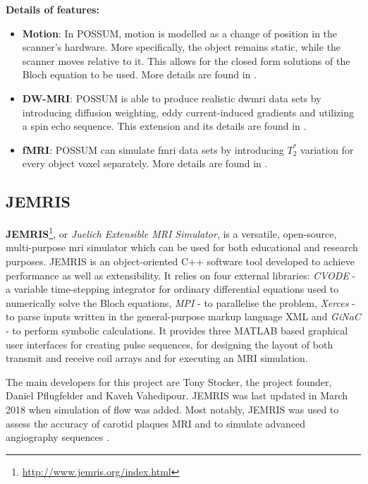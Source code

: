 \hfill

\textbf{Details of features:}
\begin{itemize}
    
    \item \textbf{Motion}: In POSSUM, motion is modelled as a change of position in the scanner's hardware. 
    More specifically, the object remains static, while the scanner moves relative to it.
    This allows for the closed form solutions of the Bloch equation to be used.
    More details are found in \cite{Drobnjak2006}.
    
    \item \textbf{DW-MRI}: POSSUM is able to produce realistic \ac{dwmri} data sets by introducing diffusion weighting, eddy current-induced gradients and utilizing a spin echo sequence.
    This extension and its details are found in \cite{Graham2016}.
    
    \item \textbf{fMRI}: POSSUM can simulate \ac{fmri} data sets by introducing $T_2^*$ variation for every object voxel separately.
    More details are found in \cite{Drobnjak2006}.

\end{itemize}

\hfill

\subsection{JEMRIS}
\textbf{JEMRIS}\footnote{\url{http://www.jemris.org/index.html}}, or \textit{Juelich Extensible MRI Simulator}, is a versatile, open-source, multi-purpose \ac{mri} simulator which can be used for both educational and research purposes.
JEMRIS is an object-oriented C++ software tool developed to achieve performance as well as extensibility.
It relies on four external libraries: \textit{CVODE} - a variable time-stepping integrator for ordinary differential equations used to numerically solve the Bloch equations, \textit{MPI} - to parallelise the problem, \textit{Xerces} - to parse inputs written in the general-purpose markup language XML and \textit{GiNaC} - to perform symbolic calculations. 
It provides three MATLAB based graphical user interfaces for creating pulse sequences, for designing the layout of both transmit and receive coil arrays and for executing an MRI simulation.

\hfill

The main developers for this project are Tony Stocker, the project founder, Daniel Pflugfelder and Kaveh Vahedipour.
JEMRIS was last updated in March 2018 when simulation of flow was added.
Most notably, JEMRIS was used to assess the accuracy of carotid plaques MRI \cite{Nieuwstadt2014} and to simulate advanced angiography sequences \cite{Fortin2016}.

